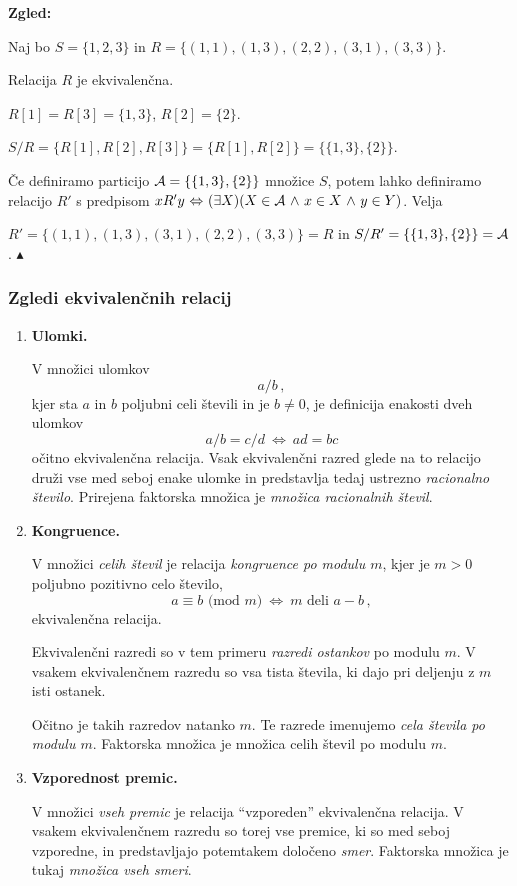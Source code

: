 \documentclass[11pt,paper=b5,footinclude,headinclude]{scrbook} %
\def\inn {{~\wedge~}}
\def\cee {{~\Leftrightarrow~}}
\def\zgled{\noindent\textbf{\color{blue} Zgled: }}
\def\kz{{\hfill{\color{blue}$\blacktriangle$}}}%
\begin{document}
\bigskip
\zgled

Naj bo $S = \{1,2,3\}$ in $R = \{(1,1),(1,3),(2,2),(3,1),(3,3)\}$.

Relacija $R$ je ekvivalenčna.

$R[1] = R[3] = \{1,3\}$, $R[2] = \{2\}$.

$S/R =  \{R[1], R[2],R[3]\} = \{R[1], R[2]\} = \{\{1,3\},\{2\}\}$.

\v Ce definiramo particijo ${\cal A} = \{\{1,3\},\{2\}\}$ množice $S$, potem lahko definiramo relacijo $R'$ s predpisom
$xR'y \cee (\exists X)(X\in {\cal A}\inn x\in X\inn y\in Y)$.
Velja

$R' = \{(1,1),(1,3),(3,1),(2,2),(3,3)\} = R$
in $S/R' = \{\{1,3\},\{2\}\} = {\cal A}$.
\kz


\subsubsection*{Zgledi ekvivalenčnih relacij}

\begin{enumerate}
  \item \textbf{ Ulomki.}

  V množici ulomkov $$a/b\,,$$
  kjer sta $a$ in $b$ poljubni celi števili in je $b\neq 0$, je definicija enakosti dveh ulomkov
  $$a/b = c/d \cee ad = bc$$
  očitno ekvivalenčna relacija. Vsak ekvivalenčni razred glede na to relacijo druži vse med seboj enake ulomke in predstavlja tedaj ustrezno {\em racionalno število}. Prirejena faktorska množica je {\em množica racionalnih števil}.
  \item \textbf{ Kongruence.}


  V množici {\em celih števil} je relacija {\em kongruence po modulu $m$}, kjer je $m> 0$ poljubno pozitivno celo število, $$a\equiv b \textrm{ (mod $m$)}\cee m \textrm{ deli }a-b\,,$$
  ekvivalenčna relacija.

  Ekvivalenčni razredi so v tem primeru {\em razredi ostankov} po modulu $m$. V vsakem ekvivalenčnem razredu so vsa tista števila, ki dajo pri deljenju z $m$ isti ostanek.

  Očitno je takih razredov natanko $m$. Te razrede imenujemo {\em cela števila po modulu $m$}. Faktorska množica je množica celih števil po modulu $m$.

  \item \textbf{ Vzporednost premic.}

V množici {\em vseh premic} je relacija ``vzporeden'' ekvivalenčna relacija. V vsakem ekvivalenčnem razredu so torej vse premice, ki so med seboj vzporedne, in predstavljajo potemtakem določeno {\em smer}. Faktorska množica je tukaj {\em množica vseh smeri}.
\end{enumerate}
\end{document}
